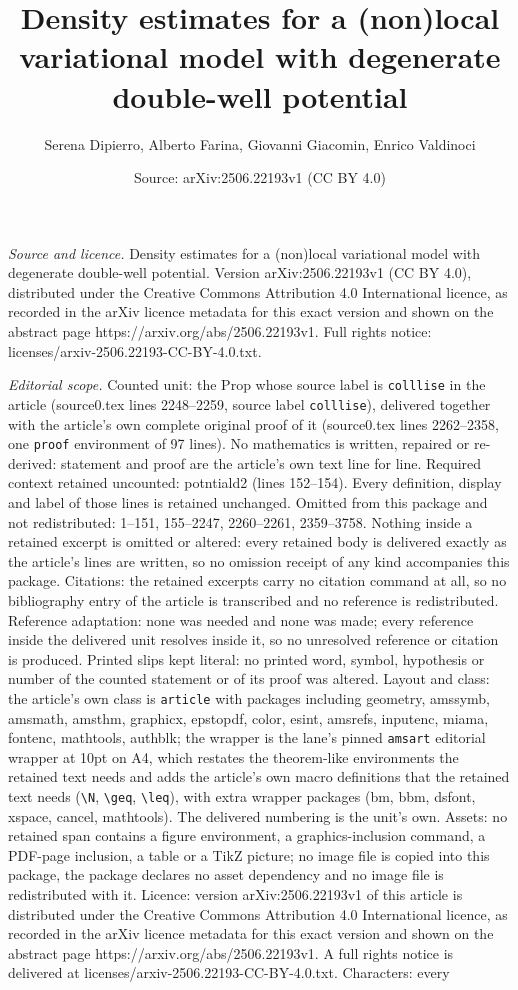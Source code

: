 \documentclass[10pt,a4paper]{amsart}
\title[Density estimates for a (non)local variational model with de]{Density estimates for a (non)local variational model with degenerate double-well potential}
\author{Serena Dipierro, Alberto Farina, Giovanni Giacomin, Enrico Valdinoci}
\date{Source: arXiv:2506.22193v1 (CC BY 4.0)}
\begin{document}
\maketitle

\noindent\emph{Source and licence.} Density estimates for a (non)local variational model with degenerate double-well potential. Version arXiv:2506.22193v1 (CC BY 4.0), distributed under the Creative Commons Attribution 4.0 International licence, as recorded in the arXiv licence metadata for this exact version and shown on the abstract page https://arxiv.org/abs/2506.22193v1. Full rights notice: licenses/arxiv-2506.22193-CC-BY-4.0.txt.\par\smallskip

\noindent\textit{Editorial scope.} Counted unit: the Prop whose source label is \texttt{colllise} in the article (source0.tex lines 2248--2259, source label \texttt{colllise}), delivered together with the article's own complete original proof of it (source0.tex lines 2262--2358, one \texttt{proof} environment of 97 lines). No mathematics is written, repaired or re-derived: statement and proof are the article's own text line for line. Required context retained uncounted: potntiald2 (lines 152--154). Every definition, display and label of those lines is retained unchanged. Omitted from this package and not redistributed: 1--151, 155--2247, 2260--2261, 2359--3758. Nothing inside a retained excerpt is omitted or altered: every retained body is delivered exactly as the article's lines are written, so no omission receipt of any kind accompanies this package. Citations: the retained excerpts carry no citation command at all, so no bibliography entry of the article is transcribed and no reference is redistributed. Reference adaptation: none was needed and none was made; every reference inside the delivered unit resolves inside it, so no unresolved reference or citation is produced. Printed slips kept literal: no printed word, symbol, hypothesis or number of the counted statement or of its proof was altered. Layout and class: the article's own class is \texttt{article} with packages including geometry, amssymb, amsmath, amsthm, graphicx, epstopdf, color, esint, amsrefs, inputenc, miama, fontenc, mathtools, authblk; the wrapper is the lane's pinned \texttt{amsart} editorial wrapper at 10pt on A4, which restates the theorem-like environments the retained text needs and adds the article's own macro definitions that the retained text needs (\texttt{\textbackslash N}, \texttt{\textbackslash geq}, \texttt{\textbackslash leq}), with extra wrapper packages (bm, bbm, dsfont, xspace, cancel, mathtools). The delivered numbering is the unit's own. Assets: no retained span contains a figure environment, a graphics-inclusion command, a PDF-page inclusion, a table or a TikZ picture; no image file is copied into this package, the package declares no asset dependency and no image file is redistributed with it. Licence: version arXiv:2506.22193v1 of this article is distributed under the Creative Commons Attribution 4.0 International licence, as recorded in the arXiv licence metadata for this exact version and shown on the abstract page https://arxiv.org/abs/2506.22193v1. A full rights notice is delivered at licenses/arxiv-2506.22193-CC-BY-4.0.txt. Characters: every 
\end{document}
